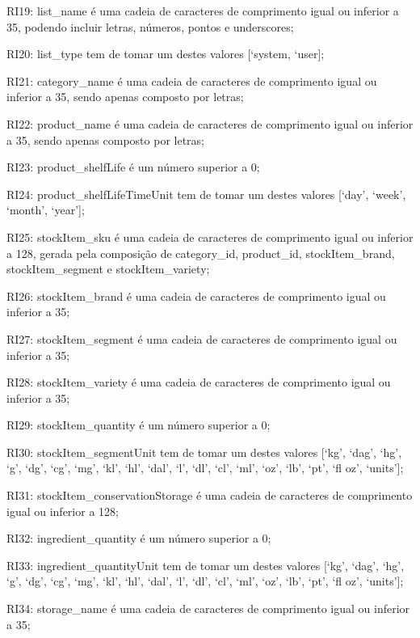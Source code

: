 \begin{description}
	\item RI19: list\_name é uma cadeia de caracteres de comprimento igual ou inferior a 35, podendo incluir letras, números, pontos e underscores;
	\item RI20: list\_type tem de tomar um destes valores [‘system, ‘user];
	\item RI21: category\_name é uma cadeia de caracteres de comprimento igual ou inferior a 35, sendo apenas composto por letras;
	\item RI22: product\_name é uma cadeia de caracteres de comprimento igual ou inferior a 35, sendo apenas composto por letras;
	\item RI23: product\_shelfLife é um número superior a 0;
	\item RI24: product\_shelfLifeTimeUnit tem de tomar um destes valores [‘day’, ‘week’, ‘month’, ‘year’];
	\item RI25: stockItem\_sku é uma cadeia de caracteres de comprimento igual ou inferior a 128, gerada pela composição de category\_id, product\_id, stockItem\_brand, stockItem\_segment e stockItem\_variety;
	\item RI26: stockItem\_brand é uma cadeia de caracteres de comprimento igual ou inferior a 35;
	\item RI27: stockItem\_segment é uma cadeia de caracteres de comprimento igual ou inferior a 35;
	\item RI28: stockItem\_variety é uma cadeia de caracteres de comprimento igual ou inferior a 35;
	\item RI29: stockItem\_quantity é um número superior a 0;
	\item RI30: stockItem\_segmentUnit tem de tomar um destes valores [‘kg’, ‘dag’, ‘hg’, ‘g’, ‘dg’, ‘cg’, ‘mg’, ‘kl’, ‘hl’, ‘dal’, ‘l’, ‘dl’, ‘cl’, ‘ml’, ‘oz’, ‘lb’, ‘pt’, ‘fl oz’, ‘units’];
	\item RI31: stockItem\_conservationStorage é uma cadeia de caracteres de comprimento igual ou inferior a 128;
	\item RI32: ingredient\_quantity é um número superior a 0;
	\item RI33: ingredient\_quantityUnit tem de tomar um destes valores [‘kg’, ‘dag’, ‘hg’, ‘g’, ‘dg’, ‘cg’, ‘mg’, ‘kl’, ‘hl’, ‘dal’, ‘l’, ‘dl’, ‘cl’, ‘ml’, ‘oz’, ‘lb’, ‘pt’, ‘fl oz’, ‘units’];
	\item RI34: storage\_name é uma cadeia de caracteres de comprimento igual ou inferior a 35;
\end{description}


